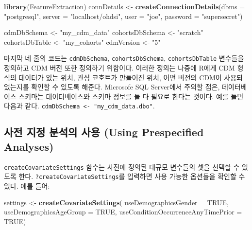 \documentclass[11pt]{book}
\newenvironment{Shaded}{\begin{snugshade}}{\end{snugshade}}
\newcommand{\KeywordTok}[1]{\textcolor[rgb]{0.13,0.29,0.53}{\textbf{#1}}}
\newcommand{\DataTypeTok}[1]{\textcolor[rgb]{0.13,0.29,0.53}{#1}}
\newcommand{\StringTok}[1]{\textcolor[rgb]{0.31,0.60,0.02}{#1}}
\newcommand{\OtherTok}[1]{\textcolor[rgb]{0.56,0.35,0.01}{#1}}
\newcommand{\NormalTok}[1]{#1}
\theoremstyle{definition}
\theoremstyle{definition}
\theoremstyle{definition}
\theoremstyle{remark}
\begin{document}
\begin{Shaded}
\begin{Highlighting}[]
\KeywordTok{library}\NormalTok{(FeatureExtraction)}
\NormalTok{connDetails <-}\StringTok{ }\KeywordTok{createConnectionDetails}\NormalTok{(}\DataTypeTok{dbms =} \StringTok{"postgresql"}\NormalTok{,}
                                       \DataTypeTok{server =} \StringTok{"localhost/ohdsi"}\NormalTok{,}
                                       \DataTypeTok{user =} \StringTok{"joe"}\NormalTok{,}
                                       \DataTypeTok{password =} \StringTok{"supersecret"}\NormalTok{)}

\NormalTok{cdmDbSchema <-}\StringTok{ "my_cdm_data"}
\NormalTok{cohortsDbSchema <-}\StringTok{ "scratch"}
\NormalTok{cohortsDbTable <-}\StringTok{ "my_cohorts"}
\NormalTok{cdmVersion <-}\StringTok{ "5"}
\end{Highlighting}
\end{Shaded}

마지막 네 줄의 코드는 \texttt{cdmDbSchema}, \texttt{cohortsDbSchema},
\texttt{cohortsDbTable} 변수들을 정의하고 CDM 버전 또한 정의하기
위함이다. 이러한 정의는 나중에 R에게 CDM 형식의 데이터가 있는 위치, 관심
코호트가 만들어진 위치, 어떤 버전의 CDM이 사용되었는지를 확인할 수
있도록 해준다. Microsofe SQL Server에서 주의할 점은, 데이터베이스
스키마는 데이터베이스와 스키마 정보를 둘 다 필요로 한다는 것이다. 예를
들면 다음과 같다.
\texttt{cdmDbSchema\ \textless{}-\ "my\_cdm\_data.dbo"}.

\subsection{사전 지정 분석의 사용 (Using Prespecified
Analyses)}\label{----using-prespecified-analyses}

\texttt{createCovariateSettings} 함수는 사전에 정의된 대규모 변수들의
셋을 선택할 수 있도록 한다. \texttt{?createCovariateSettings}를 입력하면
사용 가능한 옵션들을 확인할 수 있다. 예를 들어:

\begin{Shaded}
\begin{Highlighting}[]
\NormalTok{settings <-}\StringTok{ }\KeywordTok{createCovariateSettings}\NormalTok{(}
  \DataTypeTok{useDemographicsGender =} \OtherTok{TRUE}\NormalTok{, }
  \DataTypeTok{useDemographicsAgeGroup =} \OtherTok{TRUE}\NormalTok{, }
  \DataTypeTok{useConditionOccurrenceAnyTimePrior =} \OtherTok{TRUE}\NormalTok{) }
\end{Highlighting}
\end{Shaded}
\end{document}
